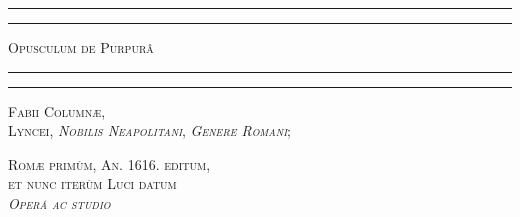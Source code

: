 \documentclass[a4paper, 11pt, oneside, polutonikogreek, german]{article}
\begin{document}
\renewcommand{\thefigure}{{\bfseries\arabic{figure}}}
\renewcommand\thefootnote{\tiny{\arabic{footnote}}}
\let\oldfootnote\footnote
    \renewcommand{\footnote}[1]{\oldfootnote{\bfseries\footnotesize#1}}
    
\bfseries
\pagestyle{plain} %
\begin{titlepage} %
	\centering %

	
	\rule{\textwidth}{1.6pt}\vspace*{-\baselineskip}\vspace*{2pt} %
	\rule{\textwidth}{0.4pt} %
	
	\vspace{1\baselineskip} %
	
	{\scshape\Huge Opusculum de Purpurâ}
	
	\vspace{1\baselineskip} %

	\rule{\textwidth}{0.4pt}\vspace*{-\baselineskip}\vspace{3.2pt} %
	\rule{\textwidth}{1.6pt} %
	
	\vspace{1\baselineskip} %
	
	
	{\scshape \Large Fabii Columnæ,\\\large Lyncei, \emph{Nobilis Neapolitani}, \emph{Genere Romani}; }
 
        \vspace{0.5\baselineskip}

        {\scshape \small Romæ primùm, An. 1616. editum,\\et nunc iterùm Luci datum \\\emph{Operâ ac studio} }

        \vspace{0.5\baselineskip}
        

\end{titlepage}
\end{document}

